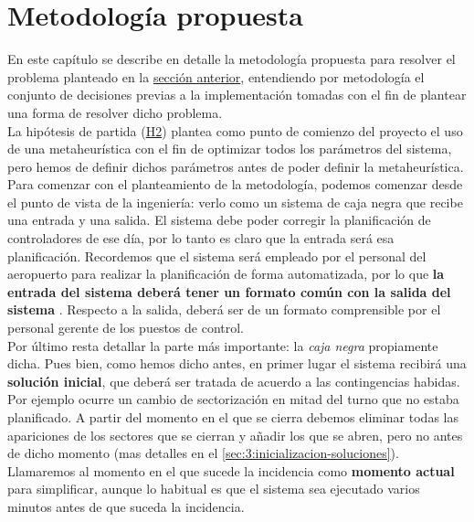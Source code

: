 \graphicspath{{capitulos/Capitulo3-Metodologia-propuesta/recursos/}}

\section{Metodología propuesta} \label{apartado:3}
En este capítulo se describe en detalle la metodología propuesta para resolver el problema planteado en la \hyperref[apartado:2]{sección anterior}, entendiendo por metodología el conjunto de decisiones previas a la implementación tomadas con el fin de plantear una forma de resolver dicho problema.
\\

La hipótesis de partida (\hyperref[H2]{H2}) plantea como punto de comienzo del proyecto el uso de una metaheurística con el fin de optimizar todos los parámetros del sistema, pero hemos de definir dichos parámetros antes de poder definir la metaheurística.
\\

Para comenzar con el planteamiento de la metodología, podemos comenzar desde el punto de vista de la ingeniería: verlo como un sistema de caja negra que recibe una entrada y una salida.
El sistema debe poder corregir la planificación de controladores de ese día, por lo tanto es claro que la entrada será esa planificación. Recordemos que el sistema \legacy{} será empleado por el personal del aeropuerto para realizar la planificación de forma automatizada, por lo que \textbf{la entrada del sistema deberá tener un formato común con la salida del sistema \legacy{}}.
Respecto a la salida, deberá ser de un formato comprensible por el personal gerente de los puestos de control.
\\

Por último resta detallar la parte más importante: la \textit{caja negra} propiamente dicha. Pues bien, como hemos dicho antes, en primer lugar el sistema recibirá una \textbf{solución inicial}, que deberá ser tratada de acuerdo a las contingencias habidas. Por ejemplo ocurre un cambio de sectorización en mitad del turno que no estaba planificado. 
A partir del momento en el que se cierra debemos eliminar todas las apariciones de los sectores que se cierran y añadir los que se abren, pero no antes de dicho momento (mas detalles en el \autoref{sec:3:inicializacion-soluciones}). 
Llamaremos al momento en el que sucede la incidencia como \textbf{momento actual} para simplificar, aunque lo habitual es que el sistema sea ejecutado varios minutos antes de que suceda la incidencia.

